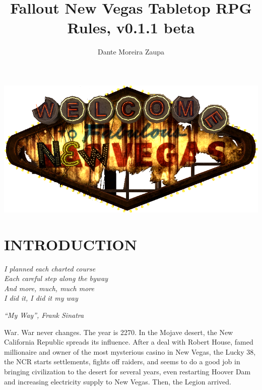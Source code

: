 \documentclass[11pt]{article} %
\title{Fallout New Vegas Tabletop RPG Rules, v0.1.1 beta}
\author{Dante Moreira Zaupa}
\begin{document}
\maketitle
\begin{center}
\includegraphics[scale=0.5]{logo_new_vegas.png}
\end{center}
\newpage
\tableofcontents
\newpage
\listoftables
\newpage


\section{INTRODUCTION}

\epigraph{\textit{I planned each charted course \\
Each careful step along the byway \\
And more, much, much more \\
I did it, I did it my way}}{\textit{``My Way'', Frank Sinatra}}

War. War never changes. The year is 2270. In the Mojave desert, the New California Republic spreads its influence. After a deal with Robert House, famed millionaire and owner of the most mysterious casino in New Vegas, the Lucky 38, the NCR starts settlements, fights off raiders, and seems to do a good job in bringing civilization to the desert for several years, even restarting Hoover Dam and increasing electricity supply to New Vegas. Then, the Legion arrived.
\end{document}
